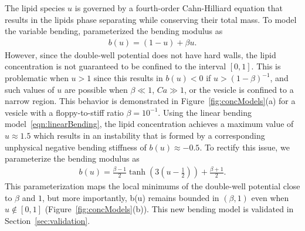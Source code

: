 \documentclass[twoside,twocolumn,9pt]{article}
\begin{document}
The lipid species $u$ is governed by a fourth-order Cahn-Hilliard
equation that results in the lipids phase separating while conserving
their total mass. To model the variable bending,
\citet{soh-tse-li-voi-low2010} parameterized the bending modulus as
\begin{align}
  \label{eqn:linearBending}
  b(u) = (1-u) + \beta u.
\end{align}
However, since the double-well potential does not have hard walls, the
lipid concentration is not guaranteed to be confined to the interval
$[0,1]$. This is problematic when $u > 1$ since this results in $b(u) <
0$ if $u > (1 - \beta)^{-1}$, and such values of $u$ are possible when
$\beta \ll 1$, $Ca \gg 1$, or the vesicle is confined to a narrow
region. This behavior is demonstrated in Figure~\ref{fig:concModels}(a)
for a vesicle with a floppy-to-stiff ratio $\beta = 10^{-1}$. Using the
linear bending model~\eqref{eqn:linearBending}, the lipid concentration
achieves a maximum value of $u \approx 1.5$ which results in an
instability that is formed by a corresponding unphysical negative
bending stiffness of $b(u) \approx -0.5$. To rectify this issue, we
parameterize the bending modulus as
\begin{align}
  b(u) = \frac{\beta-1}{2} \tanh\left(3\left(u-\frac{1}{2} 
    \right)\right) + \frac{\beta + 1}{2}.
  \label{eqn:tanhBending}
\end{align}
This parameterization maps the local minimums of the double-well
potential close to $\beta$ and $1$, but more importantly, b(u) remains
bounded in $(\beta,1)$ even when $u \notin [0,1]$
(Figure~\ref{fig:concModels}(b)). This new bending model is validated in
Section~\ref{sec:validation}.
\end{document}

